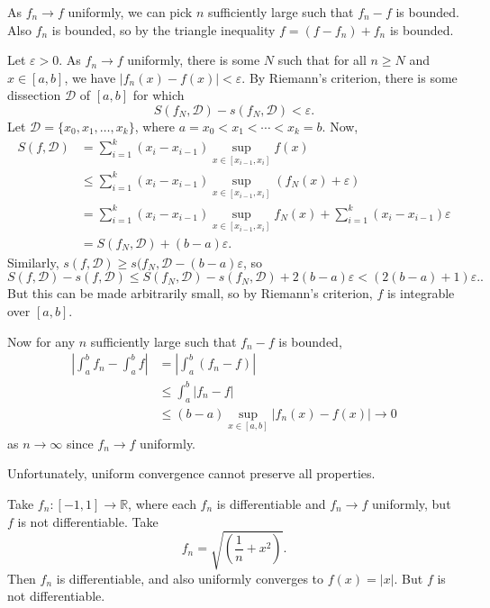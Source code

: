 \documentclass[12pt]{article}
\begin{document}
\begin{proofbox}
	As $f_n \to f$ uniformly, we can pick $n$ sufficiently large such that $f_n - f$ is bounded. Also $f_n$ is bounded, so by the triangle inequality $f = (f - f_n) + f_n$ is bounded.

	Let $\varepsilon > 0$. As $f_n \to f$ uniformly, there is some $N$ such that for all $n \geq N$ and $x \in [a, b]$, we have $|f_n(x) - f(x)| < \varepsilon$. By Riemann's criterion, there is some dissection $\mathcal{D}$ of $[a, b]$ for which
	\[
		S(f_N, \mathcal{D}) - s(f_N, \mathcal{D}) < \varepsilon
	.\]
	Let $\mathcal{D} = \{x_0, x_1, \ldots, x_k\}$, where $a = x_0 < x_1 < \cdots < x_k = b$. Now,
	\begin{align*}
		S(f, \mathcal{D}) &= \sum_{i = 1}^{k}(x_{i} - x_{i-1}) \sup_{x \in [x_{i-1}, x_{i}]} f(x) \\
				  &\leq \sum_{i = 1}^{k}(x_{i} - x_{i-1}) \sup_{x \in [x_{i-1}, x_i]} (f_N(x) + \varepsilon) \\
				  &= \sum_{i = 1}^{k}(x_{i} - x_{i-1})\sup_{x \in [x_{i-1}, x_i]}f_N(x) + \sum_{i = 1}^{k}(x_{i} - x_{i-1}) \varepsilon \\
				  &= S(f_N, \mathcal{D}) + (b - a) \varepsilon.
	\end{align*}
	Similarly, $s(f, \mathcal{D}) \geq s(f_N, \mathcal{D} - (b - a) \varepsilon$, so
	\[
		S(f, \mathcal{D}) - s(f, \mathcal{D}) \leq S(f_N, \mathcal{D}) - s(f_N, \mathcal{D}) + 2(b - a)\varepsilon < (2(b - a) + 1)\varepsilon.
	.\]
	But this can be made arbitrarily small, so by Riemann's criterion, $f$ is integrable over $[a, b]$.

	Now for any $n$ sufficiently large such that $f_n - f$ is bounded,
	\begin{align*}
		\left| \int_{a}^{b} f_n - \int_{a}^{b}f \right| &= \left| \int_{a}^{b} (f_n - f) \right| \\
								&\leq \int_{a}^{b} |f_n - f| \\
								&\leq (b - a) \sup_{x \in [a, b]}|f_n(x) - f(x)| \to 0
	\end{align*}
	as $n \to \infty$ since $f_n \to f$ uniformly.
\end{proofbox}

Unfortunately, uniform convergence cannot preserve all properties.

\begin{exbox}
	Take $f_n : [-1, 1] \to \mathbb{R}$, where each $f_n$ is differentiable and $f_n \to f$ uniformly, but $f$ is not differentiable. Take
	\[
		f_n = \sqrt{\left( \frac{1}{n} + x^2 \right)}
	.\]
	Then $f_n$ is differentiable, and also uniformly converges to $f(x) = |x|$. But $f$ is not differentiable.
\end{exbox}
\end{document}
